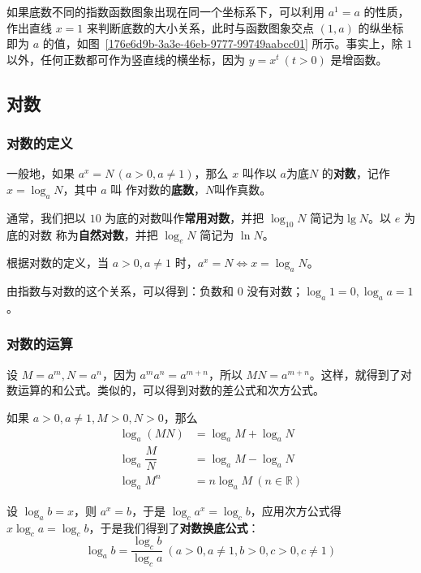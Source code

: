 \documentclass[a4paper,openany]{ctexbook}
\begin{document}
如果底数不同的指数函数图象出现在同一个坐标系下，可以利用 \(a^1=a\) 的性质，作出直线 \(x=1\) 来判断底数的大小关系，此时与函数图象交点 \((1,a)\) 的纵坐标
即为 \(a\) 的值，如图~\ref{176e6d9b-3a3e-46eb-9777-99749aabcc01} 所示。事实上，除 \(1\) 以外，任何正数都可作为竖直线的横坐标，因为 \(y=x^t\ (t>0)\) 是增函数。

\subsection{对数}

\subsubsection{对数的定义}

一般地，如果 \(a^x=N\,(a>0,a\ne 1)\)，那么 \(x\) 叫作以 \(a\)为底\(N\) 的\textbf{对数}，记作 \(x=\log_a N\)，其中 \(a\) 叫
作对数的\textbf{底数}，\(N\)叫作真数。

通常，我们把以 \(10\) 为底的对数叫作\textbf{常用对数}，并把 \(\log_{10} N\) 简记为\(\lg N\)。以 \(e\) 为底的对数
称为\textbf{自然对数}，并把 \(\log_e N\) 简记为 \(\ln N\)。

根据对数的定义，当 \(a>0,a\ne 1\) 时，\(a^x=N \Leftrightarrow x=\log_a N\)。

由指数与对数的这个关系，可以得到：负数和 \(0\) 没有对数；\(\log_a 1=0,\log_a a=1\)。

\subsubsection{对数的运算}

设 \(M=a^m,N=a^n\)，因为 \(a^m a^n=a^{m+n}\)，所以 \(MN=a^{m+n}\)。这样，就得到了对数运算的和公式。类似的，可以得到对数的差公式和次方公式。

如果 \(a>0,a\ne 1, M>0,N>0\)，那么
\begin{align*}
    \log_a(MN)          & =\log_a M+\log_a N                \\
    \log_a \dfrac{M}{N} & = \log_a M - \log_a N             \\
    \log_a M^n          & = n\log_a M \ (n \in \mathbb{R} )
\end{align*}

设 \(\log_a b=x\)，则 \(a^x=b\)，于是 \(\log_c a^x=\log_c b\)，应用次方公式得 \(x\log_c a=\log_c b\)，于是我们得到了\textbf{对数换底公式}：
\[
    \log_a b=\dfrac{\log_c b}{\log_c a}\ (a>0,a\ne 1,b>0,c>0,c\ne 1)
\]
\end{document}
